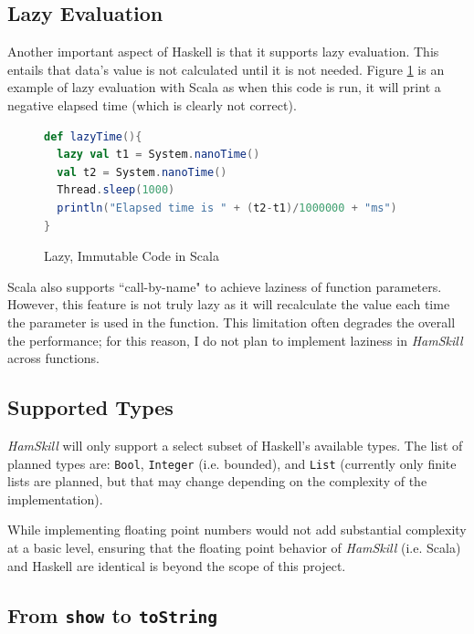 \documentclass{report}
\begin{document}
\subsection{Lazy Evaluation}\label{sec:lazyEvaluationScala}

Another important aspect of Haskell is that it supports lazy evaluation.  This entails that data's value is not calculated until it is not needed.  Figure \ref{fig:lazyImmutabilityInScala} is an example of lazy evaluation with Scala as when this code is run, it will print a negative elapsed time (which is clearly not correct).

\begin{figure}[H]
\begin{mdframed}
\begin{lstlisting}[language=Scala]
def lazyTime(){
  lazy val t1 = System.nanoTime()
  val t2 = System.nanoTime()
  Thread.sleep(1000)
  println("Elapsed time is " + (t2-t1)/1000000 + "ms")
}
\end{lstlisting}
\end{mdframed}
\caption{Lazy, Immutable Code in Scala}\label{fig:lazyImmutabilityInScala}
\end{figure}

Scala also supports ``call-by-name" to achieve laziness of function parameters.  However, this feature is not truly lazy as it will recalculate the value each time the parameter is used in the function.  This limitation often degrades the overall the performance; for this reason, I do not plan to implement laziness in \emph{HamSkill} across functions.

\subsection{Supported Types}

\emph{HamSkill} will only support a select subset of Haskell's available types.  The list of planned types are: {\tt Bool}, {\tt Integer} (i.e. bounded), and {\tt List} (currently only finite lists are planned, but that may change depending on the complexity of the implementation).

While implementing floating point numbers would not add substantial complexity at a basic level, ensuring that the floating point behavior of \emph{HamSkill} (i.e. Scala) and Haskell are identical is beyond the scope of this project.

\subsection{From {\tt show} to {\tt toString}}
\end{document}
